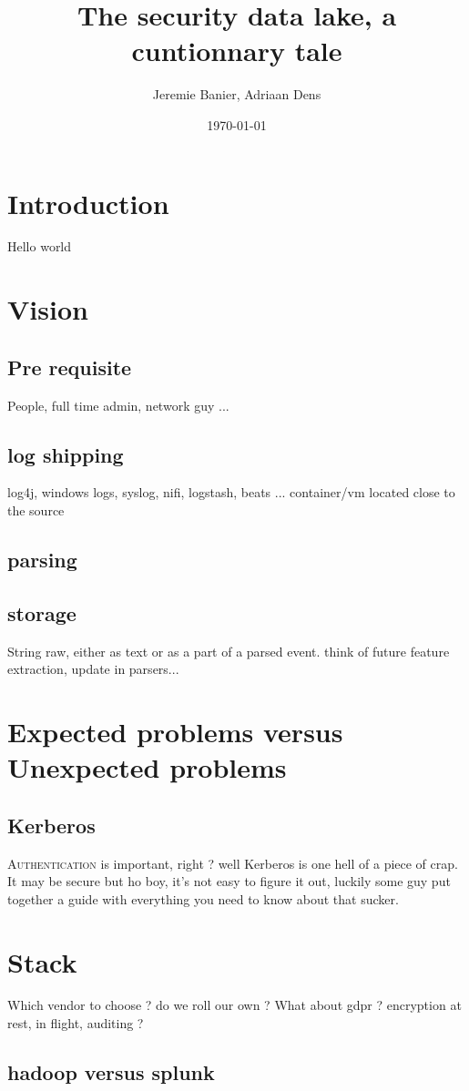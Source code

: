 \documentclass[a4paper,12pt]{article}
\begin{document}
\title{The security data lake, a cuntionnary tale}
\author{Jeremie Banier, Adriaan Dens}
\date{\today}
\maketitle
\tableofcontents
\section{Introduction}
Hello world
\section{Vision}
\subsection{Pre requisite}
People, full time admin, network guy ...
\subsection{log shipping}
log4j, windows logs, syslog, nifi, logstash, beats ...
container/vm located close to the source
\subsection{parsing}
\subsection{storage}
String raw, either as text or as a part of a parsed event. think of future feature extraction, update in parsers...
\section{Expected problems versus Unexpected problems}
\subsection{Kerberos}
\lettrine{A}{uthentication} is important, right ? well Kerberos is one hell of a piece of crap.
It may be secure but ho boy, it's not easy to figure it out, luckily some guy put together a guide with everything you need to know about that sucker.
\section{Stack}
Which vendor to choose ? do we roll our own ? 
What about gdpr ? encryption at rest, in flight, auditing ? 
\subsection{hadoop versus splunk}
\end{document}
